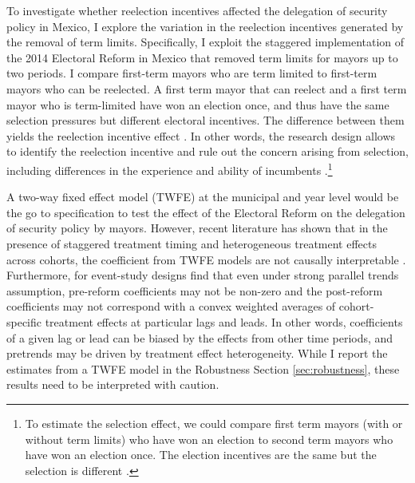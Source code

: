 To investigate whether reelection incentives affected the delegation of security policy in Mexico, I explore the variation in the reelection incentives generated by the removal of term limits.  Specifically, I exploit the staggered implementation of the 2014 Electoral Reform in Mexico that removed term limits for mayors up to two periods. I compare first-term mayors who are term limited to first-term mayors who can be reelected. A first term mayor that can reelect and a first term mayor who is term-limited have won an election once, and thus have the same selection pressures but different electoral incentives. The difference between them yields the reelection incentive effect \citep{Besley_case_1995, ashworth_2012}. In other words, the research design allows to identify the reelection incentive and rule out the concern arising from selection, including differences in the experience and ability of incumbents \citep{ferraz_finan_2011}.\footnote{To estimate the selection effect, we could compare first term mayors (with or without term limits) who have won an election to second term mayors who have won an election once. The election incentives are the same but the selection is different \citep{ashworth_2012}.} 

A two-way fixed effect model (TWFE) at the municipal and year level would be the go to specification to test the effect of the Electoral Reform on the delegation of security policy by mayors. However, recent literature has shown that in the presence of staggered treatment timing and heterogeneous treatment effects across cohorts, the coefficient from TWFE models are not causally interpretable \citep{goodman_bacon_2018, callaway_santana_2019, strezhnev_2018, chaisemarting_etal_2019}. Furthermore, for event-study designs \citet{abraham_sun_2020} find that even under strong parallel trends assumption, pre-reform coefficients may not be non-zero and the post-reform coefficients may not correspond with a convex weighted averages of cohort-specific treatment effects at particular lags and leads. In other words, coefficients of a given lag or lead can be biased by the effects from other time periods, and pretrends may be driven by treatment effect heterogeneity. While I report the estimates from a TWFE model in the Robustness Section \ref{sec:robustness}, these results need to be interpreted with caution.
   
